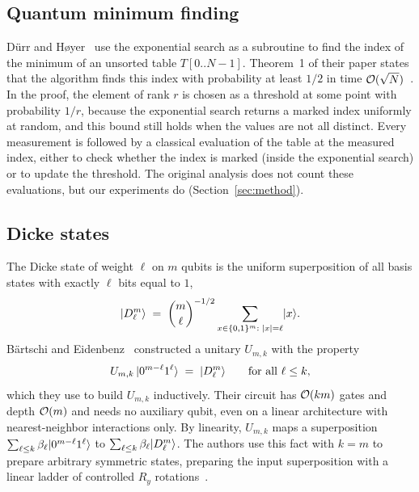 \subsection{Quantum minimum finding}\label{sec:bg-dh}

D\"urr and H{\o}yer~\cite{durr1996} use the exponential search as a subroutine to find the index of the minimum of an unsorted table $T[0..N-1]$. Theorem~1 of their paper states that the algorithm finds this index with probability at least $1/2$ in time $\mathcal{O}(\sqrt{N})$~\cite{durr1996}. In the proof, the element of rank $r$ is chosen as a threshold at some point with probability $1/r$, because the exponential search returns a marked index uniformly at random, and this bound still holds when the values are not all distinct. Every measurement is followed by a classical evaluation of the table at the measured index, either to check whether the index is marked (inside the exponential search) or to update the threshold. The original analysis does not count these evaluations, but our experiments do (Section~\ref{sec:method}).

\subsection{Dicke states}\label{sec:bg-dicke}

The Dicke state of weight $\ell$ on $m$ qubits is the uniform superposition of all basis states with exactly $\ell$ bits equal to $1$,
\begin{equation}\label{eq:dicke}
  \lvert D^{m}_{\ell} \rangle \;=\; \binom{m}{\ell}^{-1/2}\sum_{x\in\{0,1\}^{m}:\;|x|=\ell}\lvert x \rangle.
\end{equation}
B\"artschi and Eidenbenz~\cite{bartschi2019} constructed a unitary $U_{m,k}$ with the property
\begin{equation}\label{eq:umk}
  U_{m,k}\,\lvert 0^{m-\ell}1^{\ell} \rangle \;=\; \lvert D^{m}_{\ell} \rangle \qquad \text{for all } \ell\le k,
\end{equation}
which they use to build $U_{m,k}$ inductively. Their circuit has $\mathcal{O}(km)$ gates and depth $\mathcal{O}(m)$ and needs no auxiliary qubit, even on a linear architecture with nearest-neighbor interactions only. By linearity, $U_{m,k}$ maps a superposition $\sum_{\ell\le k}\beta_\ell\lvert 0^{m-\ell}1^{\ell} \rangle$ to $\sum_{\ell\le k}\beta_\ell\lvert D^{m}_{\ell} \rangle$. The authors use this fact with $k=m$ to prepare arbitrary symmetric states, preparing the input superposition with a linear ladder of controlled $R_y$ rotations~\cite[Section~4]{bartschi2019}.
